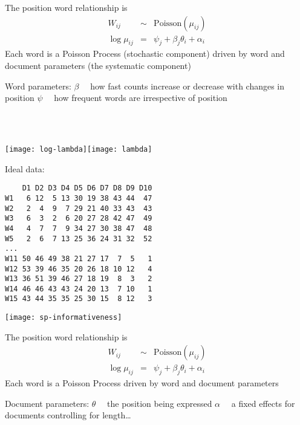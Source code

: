 \documentclass[kp]{foilpack}
\begin{document}


The position word relationship is
\begin{eqnarray*}
W_{ij} &\sim& \text{Poisson}(\mu_{ij})\\
\log \mu_{ij} &=& \psi_{j} + \beta_{j}\theta_{i} +  \alpha_{i} 
\end{eqnarray*}
Each word is a Poisson Process (stochastic component) driven by word and document parameters (the systematic component)


Word parameters:
\ita
\itm $\beta$~~ how fast counts increase or decrease with changes in position
\itm $\psi$~~ how frequent words are irrespective of position
\itz



~\\
~\\
\centerline{\texttt{[image: log-lambda]}\quad\quad\quad\texttt{[image: lambda]}}



Ideal data:
\footnotesize
\begin{verbatim}
    D1 D2 D3 D4 D5 D6 D7 D8 D9 D10
W1   6 12  5 13 30 19 38 43 44  47
W2   2  4  9  7 29 21 40 33 43  43
W3   6  3  2  6 20 27 28 42 47  49
W4   4  7  7  9 34 27 30 38 47  48
W5   2  6  7 13 25 36 24 31 32  52
...
W11 50 46 49 38 21 27 17  7  5   1
W12 53 39 46 35 20 26 18 10 12   4
W13 36 51 39 46 27 18 19  8  3   2
W14 46 46 43 43 24 20 13  7 10   1
W15 43 44 35 35 25 30 15  8 12   3
\end{verbatim}
\normalsize



\newpage


\centerline{\texttt{[image: sp-informativeness]}}



The position word relationship is
\begin{eqnarray*}
W_{ij} &\sim& \text{Poisson}(\mu_{ij})\\
\log \mu_{ij} &=& \psi_{j} + \beta_{j}\theta_{i} +  \alpha_{i}
\end{eqnarray*}
Each word is a Poisson Process driven by word and document parameters

Document parameters:
\ita
\itm $\theta$~~ the position being expressed
\itm $\alpha$~~ a fixed effects for documents controlling for length\ldots
\itz

\end{document}

